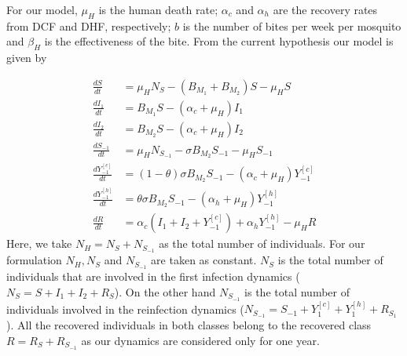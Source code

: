 For our model, $\mu_H$ is the human death rate; $\alpha_c$ and $\alpha_h$ are the recovery rates from DCF and DHF, respectively; $b$ is the number of bites per week per mosquito and $\beta_H$ is the effectiveness of the bite. From the current hypothesis our model is given by    


\begin{equation}\label{eqn:model_two_strains}
	\begin{aligned}
		\frac{dS}{dt} &=
			\mu_HN_S - (B_{M_1} + B_{M_2}) S
			-\mu_H S
		\\
		\frac{dI_1}{dt} &=
			B_{M_1} S
			-(\alpha_c + \mu_H) I_1
		\\
		\frac{dI_2}{dt} &=
			B_{M_2} S
			-(\alpha_c + \mu_H)I_2
		\\
		\frac{dS_{-1}}{dt} &=
			\mu_HN_{S_{-1}}- \sigma B_{M_2} S_{-1}-\mu_H S_{-1}
		\\
		\frac{dY_{-1} ^{[c]} }{dt} &=
			(1 - \theta) \sigma B_{M_2} S_{-1}
			-(\alpha_c + \mu_H) Y_{-1} ^ {[c]}
		\\
		\frac{dY_{-1}^{[h]}}{dt} &=
			\theta \sigma B_{M_2} S_{-1}
			-(\alpha_h + \mu_H)Y_{-1} ^{[h]} 
		\\
		\frac{dR}{dt} &= 
			\alpha_c 
				\left(
					I_1 + I_2 + Y_{-1} ^{[c]}
				\right)
			+ \alpha_h Y_{-1} ^ {[h]} - \mu_H R
	\end{aligned}
\end{equation}
Here, we take $N_H=N_S+N_{S_{-1}}$ as the total number of individuals. For our formulation $N_H, N_S$ and $N_{S_{-1}}$ are taken as constant. $N_S$ is the total number of individuals that are involved in the first infection dynamics ($N_S = S +I_1+I_2+R_S$). On the other hand $N_{S_{-1}}$ is the total number of individuals involved in the reinfection dynamics ($N_{S_{-1}}=S_{-1}+Y_1^{[c]}+ Y_1^{[h]}+R_{S_1}$). All the recovered individuals in both classes belong to the recovered class $R=R_S+R_{S_{-1}}$ as our dynamics are considered only for one year. 

